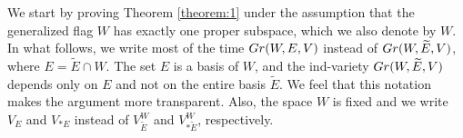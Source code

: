 \documentclass[11pt, a4paper]{article}
\begin{document}


\label{sect:proof_theorem_1_for_ind-grassmannians}

We start by proving Theorem \ref{theorem:1} under the assumption that %
the generalized flag $W$ has exactly one proper subspace, which we also denote by $W$. In what follows, we write most of the time $Gr(W,E,V)$ instead of $Gr(W,\widetilde{E},V)$, where $E=\widetilde{E}\cap W$. The set $E$ is a basis of $W$, and the ind-variety $Gr(W,\widetilde{E},V)$ depends only on $E$ and not on the entire basis $\widetilde{E}$. We feel that this notation makes the argument more transparent. Also, the space $W$ is fixed and we write $V_E$ and $V_{*E}$ instead of $V^W_{\widetilde{E}}$ and $V^W_{*\widetilde{E}}$, respectively.
\end{document}
